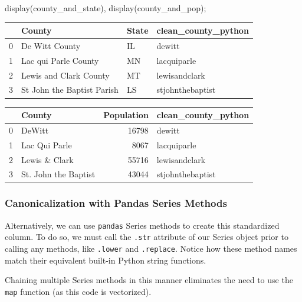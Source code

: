 \documentclass[
  letterpaper,
  DIV=11,
  numbers=noendperiod]{scrreprt}
\newenvironment{Shaded}{\begin{snugshade}}{\end{snugshade}}
\newcommand{\NormalTok}[1]{\textcolor[rgb]{0.00,0.23,0.31}{#1}}
\newcommand{\OperatorTok}[1]{\textcolor[rgb]{0.37,0.37,0.37}{#1}}
\begin{document}
\begin{Shaded}
\begin{Highlighting}[]
\NormalTok{display(county\_and\_state), display(county\_and\_pop)}\OperatorTok{;}
\end{Highlighting}
\end{Shaded}

\begin{tabular}{llll}
\toprule
{} &                      County & State & clean\_county\_python \\
\midrule
0 &              De Witt County &    IL &              dewitt \\
1 &        Lac qui Parle County &    MN &         lacquiparle \\
2 &      Lewis and Clark County &    MT &       lewisandclark \\
3 &  St John the Baptist Parish &    LS &    stjohnthebaptist \\
\bottomrule
\end{tabular}

\begin{tabular}{llrl}
\toprule
{} &                County &  Population & clean\_county\_python \\
\midrule
0 &                DeWitt &       16798 &              dewitt \\
1 &         Lac Qui Parle &        8067 &         lacquiparle \\
2 &         Lewis \& Clark &       55716 &       lewisandclark \\
3 &  St. John the Baptist &       43044 &    stjohnthebaptist \\
\bottomrule
\end{tabular}

\hypertarget{canonicalization-with-pandas-series-methods}{%
\subsubsection{Canonicalization with Pandas Series
Methods}\label{canonicalization-with-pandas-series-methods}}

Alternatively, we can use \texttt{pandas} Series methods to create this
standardized column. To do so, we must call the \texttt{.str} attribute
of our Series object prior to calling any methods, like \texttt{.lower}
and \texttt{.replace}. Notice how these method names match their
equivalent built-in Python string functions.

Chaining multiple Series methods in this manner eliminates the need to
use the \texttt{map} function (as this code is vectorized).
\end{document}
